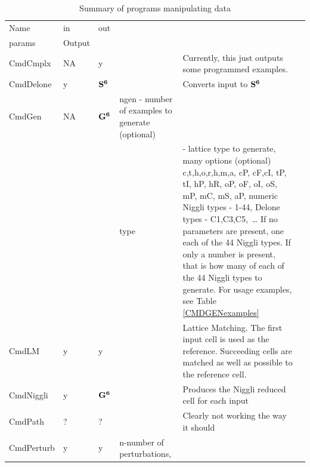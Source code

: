 \documentclass[preprint]{iucr}              %
\numberwithin{equation}{section}
\newcommand{\SVI}[0]{$\bf{S^{6}}$}
\newcommand{\GVI}[0]{$\bf{G^{6}}$}
\begin{document}
		\begin{longtable}{l l l p{} p{} l}
			\caption{Summary of programs manipulating data}
			\label{processingprogs}\\ %
			\toprule
			Name		&	in	&	out		&	\begin{parbox}[t]{2cm}{
				command line\\
				param{s}}
			\end{parbox}	& Output	\\
			\midrule
			CmdCmplx	&	NA	&	y		&\hrulefill	&Currently, 
				this just outputs some programmed examples.		\\[.9pt]
			CmdDelone	&	y	&	\SVI{}	&\hrulefill	&Converts input to \SVI{}		\\[.9pt]
			CmdGen		&	NA	&	\GVI{}	&	ngen - number of examples to generate (optional)\\
				{}		&		&			&type		& - lattice type to 
				generate, many options (optional) 
				c,t,h,o,r,h,m,a, 
				cP, cF,cI, tP, tI, hP, hR, oP, oF, oI, oS, mP, mC, mS, aP, 
				numeric Niggli types - 1-44, 
				Delone types - C1,C3,C5,~\dots 
				If no parameters are present, one each of the 44 Niggli types. 
				If only a number is present, that is how many of each of the 44 Niggli types to generate.
				For usage examples, see Table \ref{CMDGENexamples}\\[.9pt]
			CmdLM		&	y	&	y		&	\hrulefill		&		Lattice Matching. 
				The first input cell is used as the reference. 
				Succeeding cells are matched 
				as well as possible to the reference cell.\\[.9pt]
			CmdNiggli	&	y	&	\GVI{}	&\hrulefill	&		
				Produces the Niggli reduced cell for 	each input\\[.9pt]
			CmdPath		&	?	& ?			&\hrulefill	& Clearly not working the way it should		\\[.9pt]
			CmdPerturb	&	y	& y			&	n-number of perturbations, 
			

\end{longtable}
\end{document}
